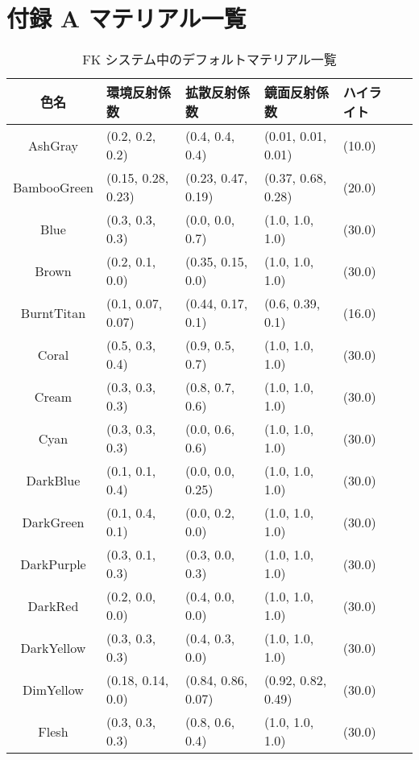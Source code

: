 \chapter*{付録 A マテリアル一覧}
\setcounter{chapter}{1}
\setcounter{table}{0}

\begin{table}[H]
\caption{FK システム中のデフォルトマテリアル一覧}
\label{tbl:MatTable}
\begin{small}
\begin{center}
\begin{tabular}{|c||l|l|l|l|l|}
\hline
色名 & 環境反射係数 & 拡散反射係数 & 鏡面反射係数 & ハイライト \\ \hline \hline
AshGray & (0.2, 0.2, 0.2) & (0.4, 0.4, 0.4) & (0.01, 0.01, 0.01) & (10.0) \\ \hline
BambooGreen & (0.15, 0.28, 0.23) & (0.23, 0.47, 0.19) & (0.37, 0.68, 0.28) & (20.0) \\ \hline
Blue & (0.3, 0.3, 0.3) & (0.0, 0.0, 0.7) & (1.0, 1.0, 1.0) & (30.0) \\ \hline
Brown & (0.2, 0.1, 0.0) & (0.35, 0.15, 0.0) & (1.0, 1.0, 1.0) & (30.0) \\ \hline
BurntTitan & (0.1, 0.07, 0.07) & (0.44, 0.17, 0.1) & (0.6, 0.39, 0.1) & (16.0) \\ \hline
Coral & (0.5, 0.3, 0.4) & (0.9, 0.5, 0.7) & (1.0, 1.0, 1.0) & (30.0) \\ \hline
Cream & (0.3, 0.3, 0.3) & (0.8, 0.7, 0.6) & (1.0, 1.0, 1.0) & (30.0) \\ \hline
Cyan & (0.3, 0.3, 0.3) & (0.0, 0.6, 0.6) & (1.0, 1.0, 1.0) & (30.0) \\ \hline
DarkBlue & (0.1, 0.1, 0.4) & (0.0, 0.0, 0.25) & (1.0, 1.0, 1.0) & (30.0) \\ \hline
DarkGreen & (0.1, 0.4, 0.1) & (0.0, 0.2, 0.0) & (1.0, 1.0, 1.0) & (30.0) \\ \hline
DarkPurple & (0.3, 0.1, 0.3) & (0.3, 0.0, 0.3) & (1.0, 1.0, 1.0) & (30.0) \\ \hline
DarkRed & (0.2, 0.0, 0.0) & (0.4, 0.0, 0.0) & (1.0, 1.0, 1.0) & (30.0) \\ \hline
DarkYellow & (0.3, 0.3, 0.3) & (0.4, 0.3, 0.0) & (1.0, 1.0, 1.0) & (30.0) \\ \hline
DimYellow & (0.18, 0.14, 0.0) & (0.84, 0.86, 0.07) & (0.92, 0.82, 0.49) & (30.0) \\ \hline
Flesh & (0.3, 0.3, 0.3) & (0.8, 0.6, 0.4) & (1.0, 1.0, 1.0) & (30.0) \\ \hline

\end{tabular}
\end{center}
\end{small}
\end{table}
